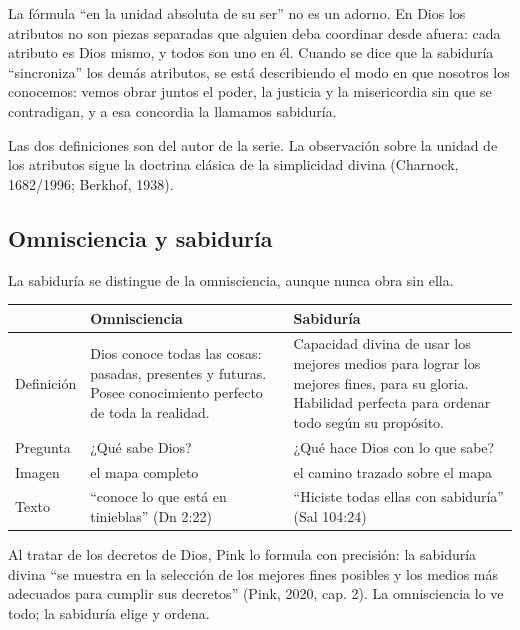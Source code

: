 \documentclass[11pt,letterpaper]{article}
\begin{document}
La fórmula ``en la unidad absoluta de su ser'' no es un adorno. En Dios los atributos no son piezas separadas que alguien deba coordinar desde afuera: cada atributo es Dios mismo, y todos son uno en él. Cuando se dice que la sabiduría ``sincroniza'' los demás atributos, se está describiendo el modo en que nosotros los conocemos: vemos obrar juntos el poder, la justicia y la misericordia sin que se contradigan, y a esa concordia la llamamos sabiduría.

\begin{nota}[Precisión]
Las dos definiciones son del autor de la serie. La observación sobre la unidad de los atributos sigue la doctrina clásica de la simplicidad divina (Charnock, 1682/1996; Berkhof, 1938).
\end{nota}

\subsection{Omnisciencia y sabiduría}

La sabiduría se distingue de la omnisciencia, aunque nunca obra sin ella.

\begin{center}\small\renewcommand{\arraystretch}{1.3}
\begin{tabular}{@{}L{2.4cm}L{6.0cm}L{6.0cm}@{}}
\toprule
 & \textbf{Omnisciencia} & \textbf{Sabiduría} \\ \midrule
Definición & Dios conoce todas las cosas: pasadas, presentes y futuras. Posee conocimiento perfecto de toda la realidad. & Capacidad divina de usar los mejores medios para lograr los mejores fines, para su gloria. Habilidad perfecta para ordenar todo según su propósito. \\
Pregunta & ¿Qué sabe Dios? & ¿Qué hace Dios con lo que sabe? \\
Imagen & el mapa completo & el camino trazado sobre el mapa \\
Texto & ``conoce lo que está en tinieblas'' (Dn 2:22) & ``Hiciste todas ellas con sabiduría'' (Sal 104:24) \\
\bottomrule
\end{tabular}\end{center}

Al tratar de los decretos de Dios, Pink lo formula con precisión: la sabiduría divina ``se muestra en la selección de los mejores fines posibles y los medios más adecuados para cumplir sus decretos'' (Pink, 2020, cap. 2). La omnisciencia lo ve todo; la sabiduría elige y ordena.
\end{document}
